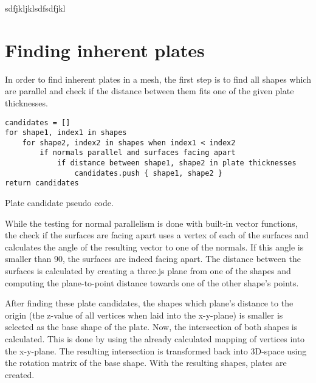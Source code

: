 \documentclass[../ClassicThesis.tex]{subfiles}
\begin{document}
sdfjkljklsdfsdfjkl

\section{Finding inherent plates}

In order to find inherent plates in a mesh, the first step is to find all shapes which are parallel and check if the distance between them fits one of the given plate thicknesses.

\begin{listing}[ht]
\begin{verbatim}
candidates = []
for shape1, index1 in shapes
    for shape2, index2 in shapes when index1 < index2
        if normals parallel and surfaces facing apart
            if distance between shape1, shape2 in plate thicknesses
                candidates.push { shape1, shape2 }
return candidates
\end{verbatim}
\caption{Plate candidate pseudo code.}
\label{lst:coffeescript}
\end{listing}

While the testing for normal parallelism is done with built-in vector functions, the check if the surfaces are facing apart uses a vertex of each of the surfaces and calculates the angle of the resulting vector to one of the normals. If this angle is smaller than 90\textdegree, the surfaces are indeed facing apart. The distance between the surfaces is calculated by creating a three.js plane from one of the shapes and computing the plane-to-point distance towards one of the other shape's points.

After finding these plate candidates, the shapes which plane's distance to the origin (the z-value of all vertices when laid into the x-y-plane) is smaller is selected as the base shape of the plate. Now, the intersection of both shapes is calculated. This is done by using the already calculated mapping of vertices into the x-y-plane. The resulting intersection is transformed back into 3D-space using the rotation matrix of the base shape. With the resulting shapes, plates are created.

\end{document}
